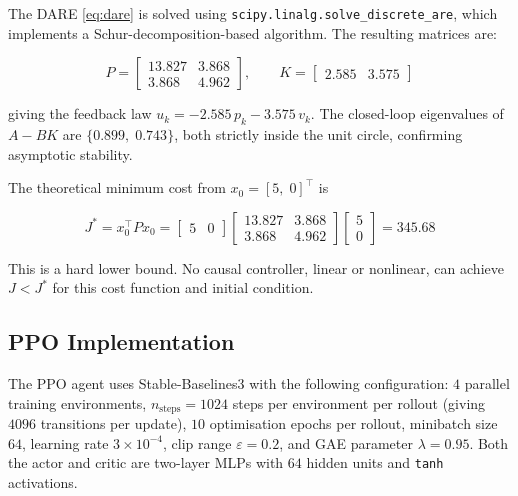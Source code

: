 \documentclass[11pt, a4paper]{article}
\newcommand{\T}{^\top}
\begin{document}
The DARE \eqref{eq:dare} is solved using
\texttt{scipy.linalg.solve\_discrete\_are}, which implements a
Schur-decomposition-based algorithm. The resulting matrices are:

\begin{equation}
  P = \begin{bmatrix} 13.827 & 3.868 \\ 3.868 & 4.962 \end{bmatrix},
  \qquad
  K = \begin{bmatrix} 2.585 & 3.575 \end{bmatrix}
  \label{eq:solution}
\end{equation}

giving the feedback law $u_k = -2.585\,p_k - 3.575\,v_k$. The
closed-loop eigenvalues of $A - BK$ are $\{0.899,\; 0.743\}$, both
strictly inside the unit circle, confirming asymptotic stability.

The theoretical minimum cost from $x_0 = [5,\;0]\T$ is

\begin{equation}
  J^* = x_0\T P x_0
  = \begin{bmatrix}5 & 0\end{bmatrix}
    \begin{bmatrix}13.827 & 3.868 \\ 3.868 & 4.962\end{bmatrix}
    \begin{bmatrix}5 \\ 0\end{bmatrix}
  = 345.68
  \label{eq:Jstar}
\end{equation}

This is a hard lower bound. No causal controller, linear or nonlinear,
can achieve $J < J^*$ for this cost function and initial condition.

\subsection{PPO Implementation}

The PPO agent uses Stable-Baselines3 with the following configuration:
$4$ parallel training environments, $n_{\text{steps}} = 1024$ steps per
environment per rollout (giving $4096$ transitions per update),
$10$ optimisation epochs per rollout, minibatch size $64$, learning rate
$3\times10^{-4}$, clip range $\varepsilon=0.2$, and GAE parameter
$\lambda=0.95$. Both the actor and critic are two-layer MLPs with $64$
hidden units and \texttt{tanh} activations.
\end{document}

